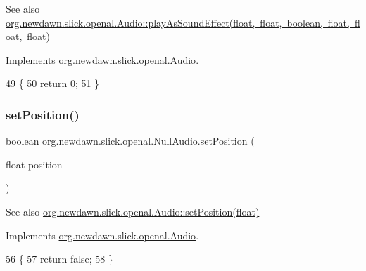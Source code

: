 \begin{DoxySeeAlso}{See also}
\mbox{\hyperlink{interfaceorg_1_1newdawn_1_1slick_1_1openal_1_1_audio_aebd22c97a1ed92528ad816e7152c7e00}{org.\+newdawn.\+slick.\+openal.\+Audio\+::play\+As\+Sound\+Effect(float, float, boolean, float, float, float)}} 
\end{DoxySeeAlso}


Implements \mbox{\hyperlink{interfaceorg_1_1newdawn_1_1slick_1_1openal_1_1_audio_aebd22c97a1ed92528ad816e7152c7e00}{org.\+newdawn.\+slick.\+openal.\+Audio}}.


\begin{DoxyCode}
49                                        \{
50         \textcolor{keywordflow}{return} 0;
51     \}
\end{DoxyCode}
\mbox{\label{classorg_1_1newdawn_1_1slick_1_1openal_1_1_null_audio_a833763970d1f01efe17bbc58bbb3ca59}} 
\subsubsection{\texorpdfstring{set\+Position()}{setPosition()}}
{\footnotesize\ttfamily boolean org.\+newdawn.\+slick.\+openal.\+Null\+Audio.\+set\+Position (\begin{DoxyParamCaption}\item[{float}]{position }\end{DoxyParamCaption})\hspace{0.3cm}{\ttfamily [inline]}}

\begin{DoxySeeAlso}{See also}
\mbox{\hyperlink{interfaceorg_1_1newdawn_1_1slick_1_1openal_1_1_audio_ace6e2e6fd29f40a8fe5daf8b28bc75e7}{org.\+newdawn.\+slick.\+openal.\+Audio\+::set\+Position(float)}} 
\end{DoxySeeAlso}


Implements \mbox{\hyperlink{interfaceorg_1_1newdawn_1_1slick_1_1openal_1_1_audio_ace6e2e6fd29f40a8fe5daf8b28bc75e7}{org.\+newdawn.\+slick.\+openal.\+Audio}}.


\begin{DoxyCode}
56                                                \{
57         \textcolor{keywordflow}{return} \textcolor{keyword}{false};
58     \}
\end{DoxyCode}
\mbox{\label{classorg_1_1newdawn_1_1slick_1_1openal_1_1_null_audio_a8c13b73a507be7786c06397c8b0175f0}} 
